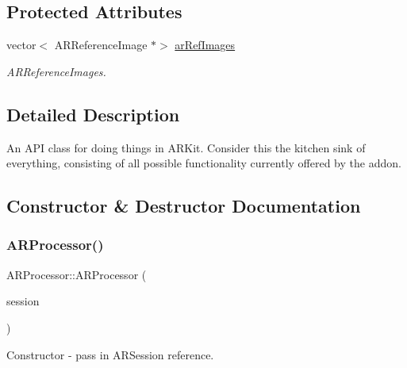 \subsection*{Protected Attributes}
\begin{DoxyCompactItemize}
\item 
vector$<$ A\+R\+Reference\+Image $\ast$$>$ \mbox{\hyperlink{class_a_r_processor_a153e891c386d86a01008ec655a4bbf20}{ar\+Ref\+Images}}
\begin{DoxyCompactList}\small\item\em A\+R\+Reference\+Images. \end{DoxyCompactList}\end{DoxyCompactItemize}


\subsection{Detailed Description}
An A\+PI class for doing things in A\+R\+Kit. Consider this the kitchen sink of everything, consisting of all possible functionality currently offered by the addon. 

\subsection{Constructor \& Destructor Documentation}
\mbox{\label{class_a_r_processor_a2dda14173a82870379c111d13a0562d6}} 
\subsubsection{\texorpdfstring{A\+R\+Processor()}{ARProcessor()}}
{\footnotesize\ttfamily A\+R\+Processor\+::\+A\+R\+Processor (\begin{DoxyParamCaption}\item[{A\+R\+Session $\ast$}]{session }\end{DoxyParamCaption})}



Constructor -\/ pass in A\+R\+Session reference. 

\mbox{\label{class_a_r_processor_a9bd83aa6f017e308d1e55e709621ae84}} 
